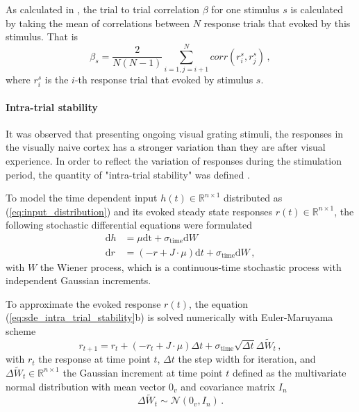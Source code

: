 \documentclass[11pt]{article}
\begin{document}
	As calculated in \cite{tragenap2023nature}, the trial to trial correlation $\beta$ for one stimulus $s$ is calculated by taking the mean of correlations between $N$ response trials that evoked by this stimulus. That is
		\begin{equation} \label{eq:ttc_sym}
			\beta_s = \frac{2}{N(N-1)} \sum_{i = 1, j = i+1}^{N} corr(r_i^s, r_j^s) \, ,
		\end{equation}
	where $r_i^s$ is the $i$-th response trial that evoked by stimulus $s$. 
	
	\paragraph{Intra-trial stability}
	
	It was observed that presenting ongoing visual grating stimuli, the responses in the visually naive cortex has a stronger variation than they are after visual experience. In order to reflect the variation of responses during the stimulation period, the quantity of "intra-trial stability" was defined \cite{tragenap2023nature}. 
	
	To model the time dependent input $h(t) \in \mathbb{R}^{n \times 1}$ distributed as (\ref{eq:input_distribution}) and its evoked steady state responses $r(t) \in \mathbb{R}^{n \times 1}$, the following stochastic differential equations were formulated
		\begin{subequations} \label{eq:sde_intra_trial_stability}
			\begin{align}
				\mathrm{d} h & = \mu \mathrm{dt} + \sigma_{\text{time}} \mathrm{d} W \\
				\mathrm{d} r & = (-r + J \cdot \mu) \mathrm{d}t + \sigma_{\text{time}} \mathrm{d} W \, ,
			\end{align}
		\end{subequations}
	with $W$ the Wiener process, which is a continuous-time stochastic process with independent Gaussian increments. 
	
	To approximate the evoked response $r(t)$, the equation (\ref{eq:sde_intra_trial_stability}b) is solved numerically with Euler-Maruyama scheme 
		\begin{equation} \label{eq:euler_maruyama}
			r_{t+1} = r_t + (-r_t + J \cdot \mu) \Delta t + \sigma_{\text{time}} \sqrt{\Delta t} \Delta \tilde{W}_t \, ,
		\end{equation}
	with $r_t$ the response at time point $t$, $\Delta t$ the step width for iteration, and $\Delta \tilde{W}_t \in \mathbb{R}^{n \times 1}$ the Gaussian increment at time point $t$ defined as the multivariate normal distribution with mean vector $0_v$ and covariance matrix $I_n$
		\begin{equation}
			\Delta \tilde{W}_t \sim \mathcal{N}(0_v, I_n) \, .
		\end{equation}
	
\end{document}
